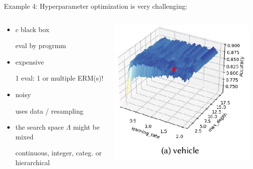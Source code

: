 \documentclass[11pt,compress,t,notes=noshow, xcolor=table]{beamer}
\begin{document}
\begin{vbframe}{Example 4: Hyperparameter optimization}
is very challenging:  
\vspace*{-0.2cm} 
\begin{columns}
	\begin{column}{0.6\textwidth}
	\begin{itemize}
		\item $c$ black box \\
		\begin{footnotesize}eval by progrmm\end{footnotesize}
		\item expensive \\
		\begin{footnotesize}
		1 eval: 1 or multiple ERM(s)!
		\end{footnotesize}
		\item noisy \\
		\begin{footnotesize}
		uses data / resampling
		\end{footnotesize}
  		\item the search space $\Lambda$ might be mixed 
		\begin{footnotesize}
		continuous, integer, categ. or hierarchical
		\end{footnotesize}
	\end{itemize}
	\end{column}
 	\begin{column}{0.35\textwidth}
		\begin{center}
			\includegraphics[width = 1.0\textwidth]{figure_man/landscapes2.jpg}

\end{center}
\end{column}
\end{columns}
\end{vbframe}
\end{document}
